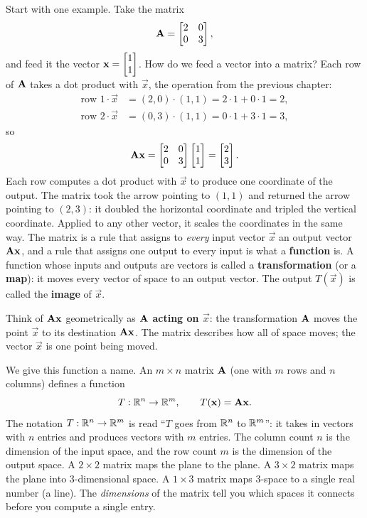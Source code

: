 Start with one example. Take the matrix
\[
  \mathbf{A} = \begin{bmatrix} 2 & 0 \\ 0 & 3 \end{bmatrix},
\]
and feed it the vector $\mathbf{x} = \begin{bmatrix}1\\1\end{bmatrix}$. How do we feed a vector into
a matrix? Each row of $\mathbf{A}$ takes a dot product with $\vec{x}$, the
operation from the previous chapter:
\begin{align*}
  \text{row 1}\cdot\vec{x} &= (2,0)\cdot(1,1) = 2\cdot 1 + 0\cdot 1 = 2, \\
  \text{row 2}\cdot\vec{x} &= (0,3)\cdot(1,1) = 0\cdot 1 + 3\cdot 1 = 3,
\end{align*}
so
\[
  \mathbf{A}\mathbf{x}
  = \begin{bmatrix} 2 & 0 \\ 0 & 3 \end{bmatrix}\begin{bmatrix}1\\1\end{bmatrix}
  = \begin{bmatrix}2\\3\end{bmatrix}.
\]
Each row computes a dot product with $\vec{x}$ to produce one coordinate of the
output. The matrix took the arrow pointing to $(1,1)$ and returned the arrow
pointing to $(2,3)$: it doubled the horizontal coordinate and tripled the vertical
coordinate. Applied to any other vector, it scales the coordinates in the same way.
The matrix is a rule that assigns to \emph{every} input vector $\vec{x}$ an output
vector $\mathbf{A}\mathbf{x}$, and a rule that assigns one output to every input is what
a \textbf{function} is. A function whose inputs and outputs are vectors is called a
\textbf{transformation} (or a \textbf{map}): it moves every vector of space to an
output vector. The output $T(\vec{x})$ is called the \textbf{image} of $\vec{x}$.

\begin{intuitionbox}
Think of $\mathbf{A}\mathbf{x}$ geometrically as \textbf{$\mathbf{A}$ acting on $\vec{x}$}:
the transformation $\mathbf{A}$ moves the point $\vec{x}$ to its destination
$\mathbf{A}\mathbf{x}$. The matrix describes how all of space moves; the
vector $\vec{x}$ is one point being moved.
\end{intuitionbox}

We give this function a name. An $m \times n$ matrix $\mathbf{A}$ (one with $m$ rows
and $n$ columns) defines a function
\[
  T : \mathbb{R}^n \to \mathbb{R}^m, \qquad T(\mathbf{x}) = \mathbf{A}\mathbf{x}.
\]
The notation $T : \mathbb{R}^n \to \mathbb{R}^m$ is read ``$T$ goes from $\mathbb{R}^n$ to $\mathbb{R}^m$'': it
takes in vectors with $n$ entries and produces vectors with $m$ entries. The
column count $n$ is the dimension of the input space, and the row count $m$ is
the dimension of the output space. A $2\times 2$ matrix maps the plane to the plane.
A $3\times 2$ matrix maps the plane into $3$-dimensional space. A $1\times 3$
matrix maps $3$-space to a single real number (a line). The \emph{dimensions} of
the matrix tell you which spaces it connects before you compute a single entry.

